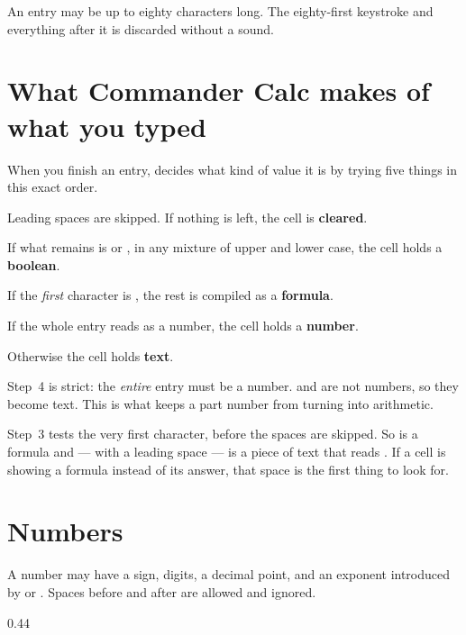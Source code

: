 An entry may be up to eighty characters long. The eighty-first keystroke and
everything after it is discarded without a sound.

\section{What Commander Calc makes of what you typed}

When you finish an entry, \ccprod{} decides what kind of value it is by trying
five things in this exact order.

\begin{ccprocedure}
\item Leading spaces are skipped. If nothing is left, the cell is
\textbf{cleared}.
\item If what remains is  or , in any mixture of upper and
lower case, the cell holds a \textbf{boolean}.
\item If the \emph{first} character is \lit{=}, the rest is compiled as a
\textbf{formula}.
\item If the whole entry reads as a number, the cell holds a \textbf{number}.
\item Otherwise the cell holds \textbf{text}.
\end{ccprocedure}

Step~4 is strict: the \emph{entire} entry must be a number.  and
 are not numbers, so they become text. This is what keeps a part
number from turning into arithmetic.

\begin{ccnote}
Step~3 tests the very first character, before the spaces are skipped. So
 is a formula and  --- with a leading space --- is a piece
of text that reads . If a cell is showing a formula instead of its
answer, that space is the first thing to look for.
\end{ccnote}

\section{Numbers}

A number may have a sign, digits, a decimal point, and an exponent introduced
by  or . Spaces before and after are allowed and ignored.

\begin{ccexamples}{0.44\linewidth}
\end{ccexamples}

